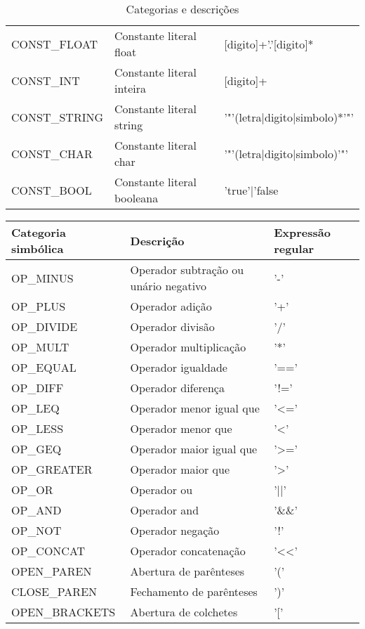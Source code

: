 \documentclass[
  12pt,				%
  oneside,			%
  a4paper,			%
  english,			%
  french,				%
  spanish,			%
  brazil,				%
]{abntex2}
\begin{document}
\begin{table}[H]
\begin{tabularx}{16cm}{|X|X|X|}
CONST\_FLOAT           & Constante literal float & [digito]+'.'[digito]*\\
CONST\_INT           & Constante literal inteira & [digito]+ \\
CONST\_STRING           & Constante literal string & '"'(letra|digito|simbolo)*'"'\\
CONST\_CHAR           & Constante literal char &
'"'(letra|digito|simbolo)'"' \\
CONST\_BOOL           & Constante literal booleana & 'true'|'false \\ \hline
\end{tabularx}
\caption{Categorias e descrições}
\label{tab:cat-desc1}
\end{table}


\begin{table}[H]
  \centering
\begin{tabular}{|l|l|l|}
  \hline
  Categoria simbólica & Descrição  & Expressão regular  \\ \hline
OP\_MINUS           & Operador subtração ou unário negativo & '-' \\
OP\_PLUS           & Operador adição & '+' \\
OP\_DIVIDE           & Operador divisão & '/' \\
OP\_MULT           & Operador multiplicação & '*' \\
OP\_EQUAL           & Operador igualdade & '==' \\
OP\_DIFF           & Operador diferença & '!=' \\
OP\_LEQ           & Operador menor igual que & '<=' \\
OP\_LESS           & Operador menor que & '<' \\
OP\_GEQ           & Operador maior igual que & '>=' \\
OP\_GREATER           & Operador maior que & '>' \\
OP\_OR           & Operador ou & '||'\\
OP\_AND           & Operador and & '\&\&'\\
OP\_NOT           & Operador negação & '!' \\
OP\_CONCAT           & Operador concatenação & '<<'\\
OPEN\_PAREN           & Abertura de parênteses & '(' \\
CLOSE\_PAREN           & Fechamento de parênteses & ')'\\
OPEN\_BRACKETS           & Abertura de colchetes  & '['\\

\end{tabular}
\end{table}
\end{document}
